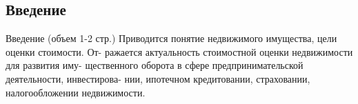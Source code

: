 \subsection*{Введение}
Введение (объем 1-2 стр.)
Приводится понятие недвижимого имущества, цели оценки стоимости. От-
ражается актуальность стоимостной оценки недвижимости для развития иму-
щественного оборота в сфере предпринимательской деятельности, инвестирова-
нии, ипотечном кредитовании, страховании, налогообложении недвижимости.